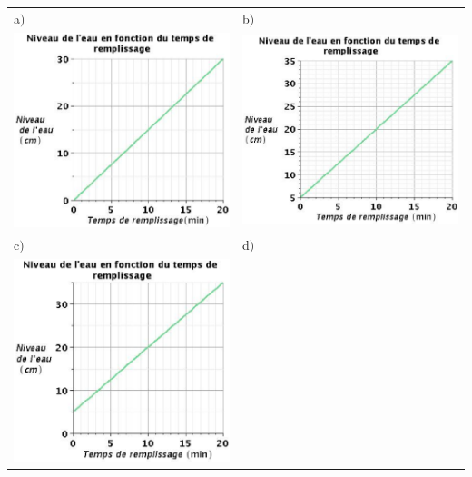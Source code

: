 \documentclass[letterpaper, 12pt]{article}
\begin{document}
\begin{tabular}{l l}
 a$)$ & b$)$ \\

 \includegraphics[width=8cm,bb=14 14 463 415]{Q2075b.eps}


&

 \includegraphics[width=8cm,bb=14 14 479 415]{Q2075c.eps}

\\
c$)$ & d$)$ \\
 \includegraphics[width=8cm,bb=14 14 447 415]{Q2075d.eps}


\end{tabular}
\end{document}
